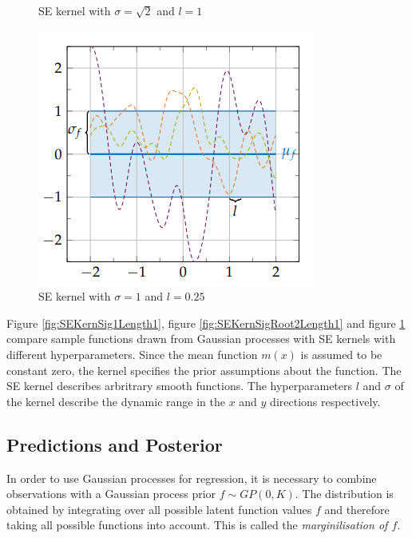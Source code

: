 \documentclass[12pt,a4paper]{report}
\theoremstyle{definition}
\begin{document}
\begin{figure}[H]
\begin{minipage}[t]{0.3\textwidth}
	    	\caption{SE kernel with $\sigma=\sqrt{2}$ and $l=1$ \citep{Kaiser2017}}
	    	\label{fig:SEKernSigRoot2Length1}
	\end{minipage}
	\hfill
	\begin{minipage}[t]{0.3\textwidth}
	 	\includegraphics[width=\linewidth]{RBF_sigma_1_lengthscale_025.png}
	    	\caption{SE kernel with $\sigma=1$ and $l=0.25$ \citep{Kaiser2017}}
	    	\label{fig:SEKernSig1Length0.25}
	\end{minipage}
\end{figure}

Figure \ref{fig:SEKernSig1Length1}, figure \ref{fig:SEKernSigRoot2Length1} and figure \ref{fig:SEKernSig1Length0.25} compare sample functions drawn from Gaussian processes with SE kernels with different hyperparameters. 
Since the mean function $m(x)$ is assumed to be constant zero, the kernel specifies the prior assumptions about the function.
The SE kernel describes arbritrary smooth functions. The hyperparameters $l$ and $\sigma$ of the kernel describe the dynamic range in the $x$ and $y$ directions respectively.

\subsection{Predictions and Posterior}

In order to use Gaussian processes for regression, it is necessary to combine observations with a Gaussian process prior $f \sim GP(0, K)$. 
The distribution is obtained by integrating over all possible latent function values $f$ and therefore taking all possible functions into account. This is called the \emph{marginilisation of $f$}. 
\end{document}
